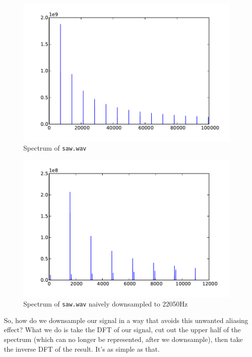 \begin{figure}[ht]\caption{Spectrum of \texttt{saw.wav}}\label{sawspec}\centering\includegraphics[width=\textwidth]{sawspec}\end{figure}

\begin{figure}[ht]\caption{Spectrum of \texttt{saw.wav} naively downsampled to 22050Hz}\label{sawspecdown}\centering\includegraphics[width=\textwidth]{sawspecdown}\end{figure}

So, how do we downsample our signal in a way that avoids this unwanted aliasing effect? What we do is take the DFT of our signal, cut out the upper half of the spectrum (which can no longer be represented, after we downsample), then take the inverse DFT of the result. It's as simple as that.

